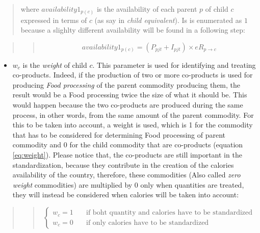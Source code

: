 \documentclass[]{article}
\providecommand{\tightlist}{%
  \setlength{\itemsep}{0pt}\setlength{\parskip}{0pt}}
\begin{document}
\begin{quote}
where \(availability1_{p(c)}\) is the availability of each parent \(p\)
of child \(c\) expressed in terms of \(c\) (as say in \emph{child
equivalent}). Is is enumerated as \(1\) because a slighlty different
availability will be found in a following step:
\end{quote}

\begin{quote}
\begin{quote}
\begin{equation}
\label{eq:availability 1}
availability1_{p(c)} = (P_{pjt} + I_{pjt})\times eR_{p\to c}
\end{equation}
\end{quote}
\end{quote}

\begin{itemize}
\tightlist
\item
  \(w_{c}\) is the \emph{weight} of child \(c\). This parameter is used
  for identifying and treating co-products. Indeed, if the production of
  two or more co-products is used for producing \emph{Food processing}
  of the parent commodity producing them, the result would be a Food
  processing twice the size of what it should be. This would happen
  because the two co-products are produced during the same process, in
  other words, from the same amount of the parent commodity. For this to
  be taken into account, a weight is used, which is 1 for the commodity
  that has to be considered for determining Food processing of parent
  commodity and 0 for the child commodity that are co-products (equation
  \ref{eq:weight}). Please notice that, the co-products are still
  important in the standardization, because they contribute in the
  creation of the calories availability of the country, therefore, these
  commodities (Also called \emph{zero weight} commodities) are
  multiplied by 0 only when quantities are treated, they will instead be
  considered when calories will be taken into account:
\end{itemize}

\begin{quote}
\begin{quote}
\begin{equation}
\label{eq:weight}
\begin{cases}
w_{c} = 1      & \quad \text{if boht quantity and calories have to be standardized} \\
w_{c} = 0      & \quad \text{if only calories have to be standardized}
\end{cases}
\end{equation}
\end{quote}
\end{quote}
\end{document}
